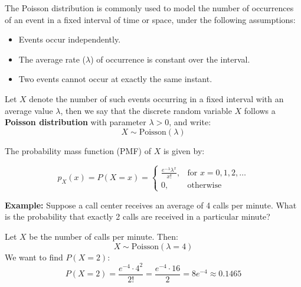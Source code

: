 \documentclass[twoside]{book}
\begin{document}
The {Poisson distribution} is commonly used to model the number of occurrences of an event in a fixed interval of time or space, under the following assumptions:
\begin{itemize}
    \item Events occur independently.
    \item The average rate ($\lambda$) of occurrence is constant over the interval.
    \item Two events cannot occur at exactly the same instant.
\end{itemize}

Let $X$ denote the number of such events occurring in a fixed interval with an average value $\lambda$, then we say that the discrete random variable $X$ follows a \textbf{Poisson distribution} with parameter $\lambda > 0$, and write:
\[
X \sim \text{Poisson}(\lambda)
\]

The probability mass function (PMF) of $X$ is given by:
\begin{textbox}
\[
p_X(x) = P(X = x) = 
\begin{cases}
\displaystyle \frac{e^{-\lambda} \lambda^x}{x!}, & \text{for } x = 0, 1, 2, \ldots \\
0, & \text{otherwise}
\end{cases}
\]
\end{textbox}

\textbf{Example:} Suppose a call center receives an average of 4 calls per minute. What is the probability that exactly 2 calls are received in a particular minute?

Let $X$ be the number of calls per minute. Then:
\[
X \sim \text{Poisson}(\lambda = 4)
\]
We want to find $P(X = 2)$:
\[
P(X = 2) = \frac{e^{-4} \cdot 4^2}{2!} = \frac{e^{-4} \cdot 16}{2} = 8e^{-4} \approx 0.1465
\]

\begin{center}
\end{center}
\end{document}

